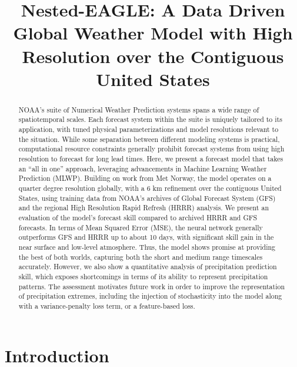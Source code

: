 \documentclass[11pt]{article}
\title{Nested-EAGLE: A Data Driven Global Weather Model with High
Resolution over the Contiguous\\United States}
\begin{document}

\maketitle

\begin{abstract}
    NOAA’s suite of Numerical Weather Prediction systems spans a wide range of
    spatiotemporal scales. Each forecast system within the suite is uniquely
    tailored to its application, with tuned physical parameterizations and model
    resolutions relevant to the situation. While some separation between
    different modeling systems is practical, computational resource constraints
    generally prohibit forecast systems from using high resolution to forecast
    for long lead times.
    Here, we present a forecast model that takes an ``all in one'' approach,
    leveraging advancements in Machine Learning Weather Prediction (MLWP). Building
    on work from Met Norway, the model operates on a quarter degree resolution
    globally, with a 6 km refinement over the contiguous United States, using
    training data from NOAA’s archives of Global Forecast System (GFS) and the
    regional High Resolution Rapid Refresh (HRRR) analysis. We present an evaluation
    of the model’s forecast skill compared to archived HRRR and GFS forecasts. In
    terms of Mean Squared Error (MSE), the neural network generally outperforms GFS
    and HRRR up to about 10 days, with significant skill gain in the near surface
    and low-level atmosphere. Thus, the model shows promise at providing the best of
    both worlds, capturing both the short and medium range timescales accurately.
    However, we also show a quantitative analysis of precipitation prediction skill,
    which exposes shortcomings in terms of its ability to represent precipitation
    patterns. The assessment motivates future work in order to improve the
    representation of precipitation extremes, including the injection of
    stochasticity into the model along with a variance-penalty loss term, or a
    feature-based loss.

\end{abstract}

\section{Introduction}
\end{document}
